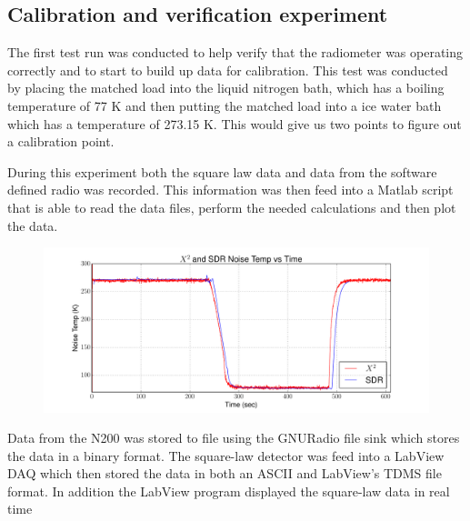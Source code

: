\subsection{Calibration and verification experiment}
The first test run was conducted to help verify that the radiometer was operating correctly and to start to build up data for calibration.  This test was conducted by placing the matched load into the liquid nitrogen bath, which has a boiling temperature of 77 K and then putting the matched load into a ice water bath which has a temperature of 273.15 K.  This would give us two points to figure out a calibration point.

During this experiment both the square law data and data from the software defined radio was recorded.  This information was then feed into a Matlab script that is able to read the data files, perform the needed calculations and then plot the data.  

\begin{figure}[h!tb] \centering

\includegraphics[width=\textwidth]{Experiments/Exp1/x2_SDR_Calibrated.pdf}

\label{lab1_x2_n200}
\end{figure}

Data from the N200 was stored to file using the GNURadio file sink which stores the data in a binary format.  The square-law detector was feed into a LabView DAQ which then stored the data in both an ASCII and LabView's TDMS file format.  In addition the LabView program displayed the square-law data in real time

